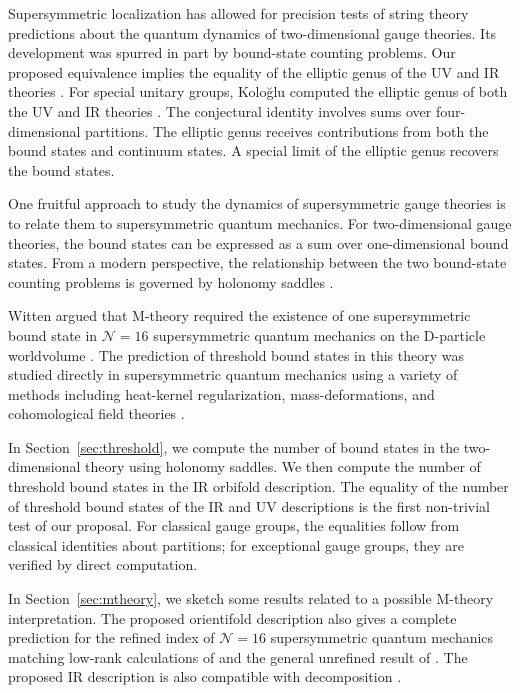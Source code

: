 \documentclass[12pt]{article}
\numberwithin{equation}{section}%
\theoremstyle{definition}
\begin{document}
Supersymmetric localization has allowed for precision tests of string theory predictions about the quantum dynamics of two-dimensional gauge theories.  Its development was spurred in part by bound-state counting problems.
Our proposed equivalence implies the equality of the elliptic genus of the UV and IR theories \cite{Witten:1986bf, MR3177993, MR3302634, Gadde:2013dda}.  For special unitary groups, Kolo\u{g}lu computed the elliptic genus of both the UV and IR theories \cite{Kologlu:2016aev}.  The conjectural identity involves sums over four-dimensional partitions.  The elliptic genus receives contributions from both the bound states and continuum states.  A special limit of the elliptic genus recovers the bound states.

One fruitful approach to study the dynamics of supersymmetric gauge theories is to relate them to supersymmetric quantum mechanics.  For two-dimensional gauge theories, the bound states can be expressed as a sum over one-dimensional bound states.  From a modern perspective, the relationship between the two bound-state counting problems is governed by holonomy saddles \cite{Hwang:2017nop, Hwang:2018riu}.


Witten argued that M-theory required the existence of one supersymmetric bound state in $\mathcal{N} = 16$ supersymmetric quantum mechanics on the D-particle worldvolume \cite{Witten:1995im, Sen:1995vr}.  The prediction of threshold bound states in this theory was studied directly in supersymmetric quantum mechanics using a variety of methods including heat-kernel regularization, mass-deformations, and cohomological field theories \cite{Yi:1997eg, Sethi:1997pa, Porrati:1997ej, Green:1997tn, Moore:1998et, Kac:1999av}.  

In Section~\ref{sec:threshold}, we compute the number of bound states in the two-dimensional theory using holonomy saddles.  We then compute the number of threshold bound states in the IR orbifold description.  The equality of the number of threshold bound states of the IR and UV descriptions is the first non-trivial test of our proposal.  For classical gauge groups, the equalities follow from classical identities about partitions; for exceptional gauge groups, they are verified by direct computation.
  
In Section~\ref{sec:mtheory}, we sketch some results related to a possible M-theory interpretation.  The proposed orientifold description also gives a complete prediction for the refined index of $\mathcal{N} = 16$ supersymmetric quantum mechanics matching low-rank calculations of \cite{Lee:2016dbm} and the general unrefined result of \cite{Kac:1999av}.  The proposed IR description is also compatible with decomposition \cite{Hellerman:2006zs, Sharpe:2022ene}.
\end{document}
